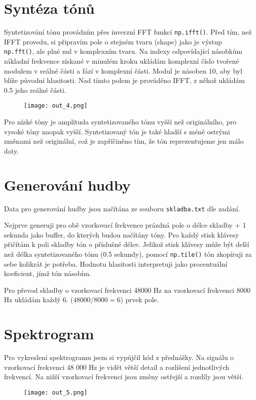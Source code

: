 \documentclass[11pt,a4paper]{article}
\begin{document}
\section{Syntéza tónů}

Syntetizování tónu provádním přes inverzní FFT funkcí \verb|np.ifft()|. Před tím, než IFFT provedu, si připravím pole o stejném tvaru (shape) jako je výstup \verb|np.fft()|, ale plné nul v komplexním tvaru. Na indexy odpovídající násobkům základní frekvence získané v minulém kroku ukládám komplexní číslo tvořené modulem v reálné části a fází v komplexní části. Modul je násoben 10, aby byl blíže původní hlasitosti.
Nad tímto polem je prováděno IFFT, z něhož ukládám 0.5 jeho reálné části.

\begin{figure}[H]
    \begin{center}
        \texttt{[image: out\_4.png]}
    \end{center}
\end{figure}

Pro nízké tóny je amplituda syntetizovaného tónu vyšší než originálního, pro vysoké tóny naopak vyšší. Syntetizovaný tón je také hladší s méně ostrými změnami než originální, což je zapříčiněno tím, že tón reprezentujeme jen málo daty.

\newpage

\section{Generování hudby}

Data pro generování hudby jsou načítána ze souboru \verb|skladba.txt| dle zadání.

Nejprve generuji pro obě vzorkovací frekvence prázdná pole o délce skladby + 1 sekunda jako buffer, do kterých budou načítány tóny. Pro každý stisk klávesy přičítám k poli skladby tón o příslušné délce. Jelikož stisk klávesy může být delší než délka syntetizovaného tónu (0.5 sekundy), pomocí \verb|np.tile()| tón zkopíruji za sebe kolikrát je potřeba. Hodnotu hlasitosti interpretuji jako procentuální koeficient, jímž tón násobím.

Pro převod skladby o vzorkovací frekvenci 48000 Hz na vzorkovací frekvenci 8000 Hz ukládám každý 6. ($48000/8000=6$) prvek pole.

\section{Spektrogram}

Pro vykreslení spektrogramu jsem si vypůjčil kód z přednášky. Na signálu o vzorkovací frekvenci 48 000 Hz je vidět větší detail a rozlišení jednotlivých frekvencí. Na nižší vzorkovací frekvenci jsou změny ostřejší a rozdíly jsou větší.

\begin{figure}[H]
    \begin{center}
        \texttt{[image: out\_5.png]}
    \end{center}
\end{figure}
\end{document}
